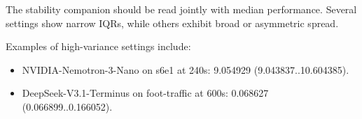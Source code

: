 The stability companion should be read jointly with median performance. Several settings show narrow IQRs, while others exhibit broad or asymmetric spread.

Examples of high-variance settings include:
\begin{itemize}
  \item NVIDIA-Nemotron-3-Nano on s6e1 at 240s: 9.054929 (9.043837..10.604385).
  \item DeepSeek-V3.1-Terminus on foot-traffic at 600s: 0.068627 (0.066899..0.166052).
\end{itemize}
